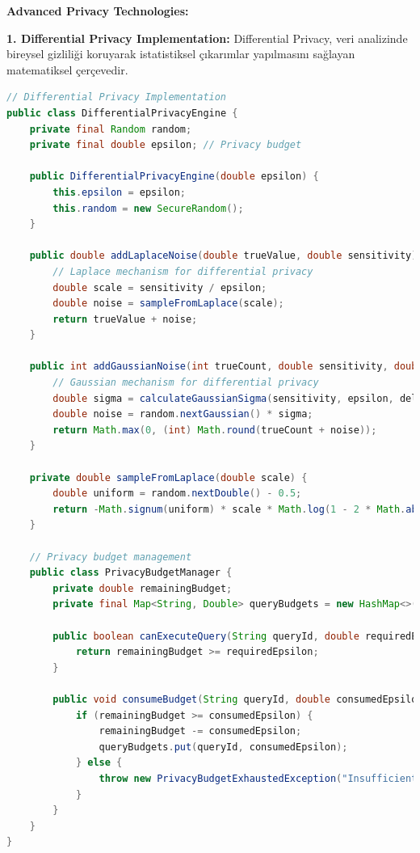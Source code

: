 \textbf{Advanced Privacy Technologies:}

\textbf{1. Differential Privacy Implementation:}
Differential Privacy, veri analizinde bireysel gizliliği koruyarak istatistiksel çıkarımlar yapılmasını sağlayan matematiksel çerçevedir.

\begin{lstlisting}[breaklines=true,basicstyle=\ttfamily\footnotesize,language=Java]
// Differential Privacy Implementation
public class DifferentialPrivacyEngine {
    private final Random random;
    private final double epsilon; // Privacy budget
    
    public DifferentialPrivacyEngine(double epsilon) {
        this.epsilon = epsilon;
        this.random = new SecureRandom();
    }
    
    public double addLaplaceNoise(double trueValue, double sensitivity) {
        // Laplace mechanism for differential privacy
        double scale = sensitivity / epsilon;
        double noise = sampleFromLaplace(scale);
        return trueValue + noise;
    }
    
    public int addGaussianNoise(int trueCount, double sensitivity, double delta) {
        // Gaussian mechanism for differential privacy
        double sigma = calculateGaussianSigma(sensitivity, epsilon, delta);
        double noise = random.nextGaussian() * sigma;
        return Math.max(0, (int) Math.round(trueCount + noise));
    }
    
    private double sampleFromLaplace(double scale) {
        double uniform = random.nextDouble() - 0.5;
        return -Math.signum(uniform) * scale * Math.log(1 - 2 * Math.abs(uniform));
    }
    
    // Privacy budget management
    public class PrivacyBudgetManager {
        private double remainingBudget;
        private final Map<String, Double> queryBudgets = new HashMap<>();
        
        public boolean canExecuteQuery(String queryId, double requiredEpsilon) {
            return remainingBudget >= requiredEpsilon;
        }
        
        public void consumeBudget(String queryId, double consumedEpsilon) {
            if (remainingBudget >= consumedEpsilon) {
                remainingBudget -= consumedEpsilon;
                queryBudgets.put(queryId, consumedEpsilon);
            } else {
                throw new PrivacyBudgetExhaustedException("Insufficient privacy budget");
            }
        }
    }
}
\end{lstlisting}

